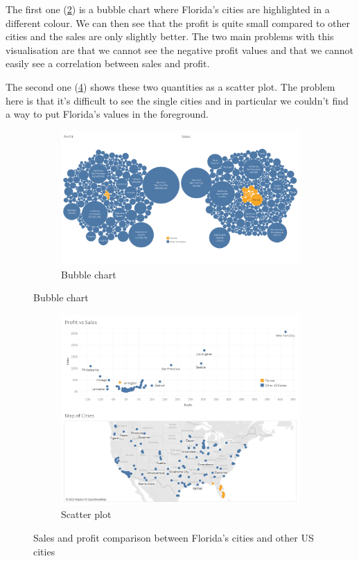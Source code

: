 \documentclass[openany]{article}
\begin{document}
The first one (\ref {bubbles}) is a bubble chart where Florida's cities are highlighted in a different colour. We can then see that the profit is quite small compared to other cities and the sales are only slightly better. The two main problems with this visualisation are that we cannot see the negative profit values and that we cannot easily see a correlation between sales and profit.

The second one (\ref {scatter_plot}) shows these two quantities as a scatter plot. The problem here is that it's difficult to see the single cities and in particular we couldn't find a way to put Florida's values in the foreground.

\begin{figure}[h]
\centering
	\begin{subfigure}{\textwidth}
		\centering
		\includegraphics[width=\linewidth]{Tableau/d_a}
		\caption{Bubble chart}
		\label {bubbles}
	\end{subfigure}
\end{figure}

\begin{figure}[h]\ContinuedFloat
\centering
	\begin{subfigure}{\textwidth}
		\centering
		\includegraphics[width=\linewidth]{Tableau/d_b}
		\caption{Scatter plot}
		\label {scatter_plot}
	\end{subfigure}
	\caption{Sales and profit comparison between Florida's cities and other US cities}
\end{figure}
\end{document}
